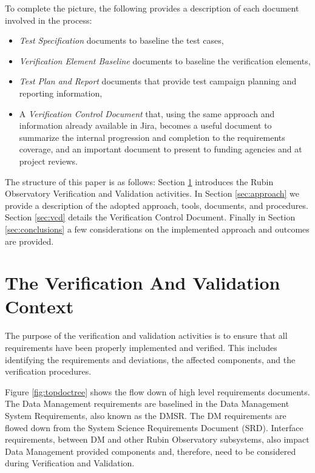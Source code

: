 To complete the picture, the following provides a description of each document involved in the process:
\begin{itemize}
\item  {\textit{Test Specification} documents to baseline the test cases, }
\item {\textit{Verification Element Baseline} documents to baseline the verification elements,}
\item  {\textit{Test Plan and Report} documents that provide test campaign planning and reporting information,}
\item  {A \textit{Verification Control Document} that, using the same approach and information already available in Jira, becomes a useful document to summarize the  internal progression and completion to the requirements coverage, and an important document to present to funding agencies and at project reviews. }
\end{itemize}

The structure of this paper is as follows:  Section \ref{sec:vandvproblem} introduces the Rubin Observatory Verification and Validation activities.
In Section \ref{sec:approach} we provide a description of the adopted approach, tools, documents, and procedures. 
Section \ref{sec:vcd} details the Verification Control Document. 
Finally in Section \ref{sec:conclusions} a few considerations on the implemented approach and outcomes are provided.

\section{The Verification And Validation Context}
\label{sec:vandvproblem}

The purpose of the verification and validation activities is to ensure that all requirements have been properly implemented and verified.
This includes identifying the requirements and deviations, the affected components, and the verification procedures.

Figure \ref{fig:topdoctree} shows the flow down of high level requirements documents.
The Data Management requirements are baselined in the Data Management System Requirements\cite{LSE-61}, also known as the DMSR.
The DM requirements are flowed down from the System Science Requirements Document (SRD)\cite{LPM-17}. Interface requirements,
between DM and other Rubin Observatory subsystems, also impact Data Management provided components and, therefore,
need to be considered during Verification and Validation.

